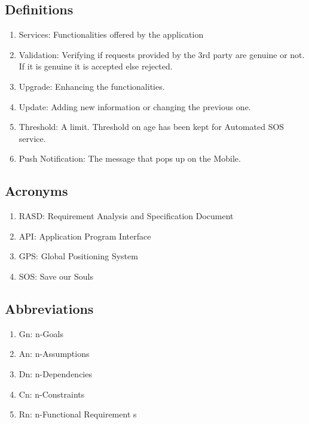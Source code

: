 \subsection{Definitions}
\begin{enumerate}
\item Services: Functionalities offered by the application
\item Validation: Verifying if requests provided by the 3rd party are genuine or not. If it is genuine it is accepted else rejected.
\item Upgrade: Enhancing the functionalities. 
\item Update: Adding new information or changing the previous one.
\item Threshold: A limit. Threshold on age has been kept for Automated SOS service.
\item Push Notification: The message that pops up on the Mobile. 
\end{enumerate}

\subsection{Acronyms}
\begin{enumerate}
\item RASD: Requirement Analysis and Specification Document
\item API: Application Program Interface
\item GPS: Global Positioning System
\item SOS: Save our Souls
\end{enumerate}

\subsection{Abbreviations}
\begin{enumerate}
\item Gn: n-Goals
\item An: n-Assumptions
\item Dn: n-Dependencies
\item Cn: n-Constraints
\item Rn: n-Functional Requirement s
\end{enumerate}
